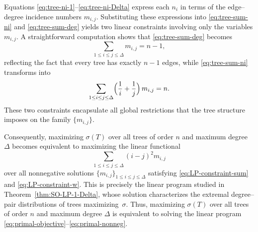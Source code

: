\documentclass[preprint,12pt]{elsarticle}
\begin{document}
Equations \eqref{eq:tree-ni-1}--\eqref{eq:tree-ni-Delta} express each $n_i$ in terms of the edge–degree incidence numbers $m_{i,j}$.
Substituting these expressions into \eqref{eq:tree-sum-ni} and \eqref{eq:tree-sum-deg} yields two linear constraints involving only the variables $m_{i,j}$.  
A straightforward computation shows that \eqref{eq:tree-sum-deg} becomes
\begin{equation}
\sum_{1\le i\le j\le \Delta} m_{i,j} = n-1,
\label{eq:LP-constraint-sum}
\end{equation}
reflecting the fact that every tree has exactly $n-1$ edges, while 
\eqref{eq:tree-sum-ni} transforms into
\begin{equation}
\sum_{1\le i\le j\le \Delta}
\Bigl(\frac{1}{i}+\frac{1}{j}\Bigr)\, m_{i,j} = n.
\label{eq:LP-constraint-w}
\end{equation}
These two constraints encapsulate all global restrictions that the tree structure imposes on the family $\{m_{i,j}\}$.

\medskip

Consequently, maximizing $\sigma(T)$ over all trees of order $n$ and maximum degree $\Delta$ becomes equivalent to maximizing the linear functional
\[
\sum_{1\le i\le j\le \Delta} (i-j)^2 m_{i,j}
\]
over all nonnegative solutions $\{m_{i,j}\}_{1\le i\le j\le \Delta}$ satisfying 
\eqref{eq:LP-constraint-sum} and \eqref{eq:LP-constraint-w}.
This is precisely the linear program studied in Theorem~\ref{thm:SO-LP-1-Delta}, whose solution characterizes the extremal degree–pair distributions of trees maximizing~$\sigma$.
Thus, maximizing $\sigma(T)$ over all trees of order $n$ and maximum degree
$\Delta$ is equivalent to solving the linear program
\eqref{eq:primal-objective}--\eqref{eq:primal-nonneg}.



\end{document}
